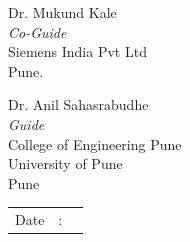 \begin{minipage}[t]{0.5\textwidth}%
\begin{flushleft}
 
Dr. Mukund Kale\\
\emph{Co-Guide}\\
Siemens India Pvt Ltd\\
Pune.
\end{flushleft}
\end{minipage}\hspace{0.5cm}
\begin{minipage}[t]{0.4\textwidth}%
\begin{flushleft}
 {
Dr. Anil Sahasrabudhe \\
\emph{Guide}}\\
College of Engineering Pune\\
University of Pune \\
Pune

\end{flushleft}

\end{minipage}
 \vfill
\begin{minipage}[t]{0.5\textwidth}%
\vspace*{135pt}
\begin{tabular}{lcl}
Date & : & \tabularnewline
\end{tabular}%
\end{minipage}\hspace{0.5cm}
\begin{minipage}[t]{0.4\textwidth}%

\end{minipage}




